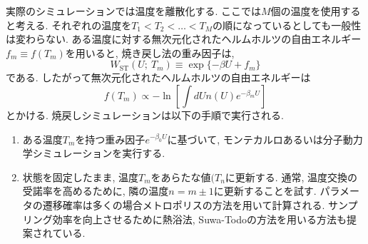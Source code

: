実際のシミュレーションでは温度を離散化する. 
ここでは$M$個の温度を使用すると考える. 
それぞれの温度を$T_{1} < T_{2} < \ldots < T_{M}$の順になっているとしても一般性は変わらない. 
ある温度に対する無次元化されたヘルムホルツの自由エネルギー$f_{m} \equiv f(T_{m})$を用いると, 焼き戻し法の重み因子は, 
\begin{equation}
  W_{\mathrm{ST}}(U;~T_{m}) \equiv \exp\{-\beta U + f_{m}\}
\end{equation}
である. したがって無次元化されたヘルムホルツの自由エネルギーは
\begin{equation}
  f(T_{m}) \propto
  - \ln\left[\int dU n(U) e^{-\beta_{m} U}\right]
\end{equation}
とかける. 
焼戻しシミュレーションは以下の手順で実行される.
\begin{enumerate}
 \item ある温度$T_{m}$を持つ重み因子$e^{-\beta_{0} U}$に基づいて, モンテカルロあるいは分子動力学シミュレーションを実行する. 
 \item 状態を固定したまま,  温度$T_{m}$をあらたな値$(T_{n}$に更新する. 通常, 温度交換の受諾率を高めるために, 隣の温度$n = m \pm 1$に更新することを試す. パラメータの遷移確率は多くの場合メトロポリスの方法を用いて計算される. サンプリング効率を向上させるために熱浴法, Suwa-Todoの方法を用いる方法も提案されている.
\end{enumerate}

